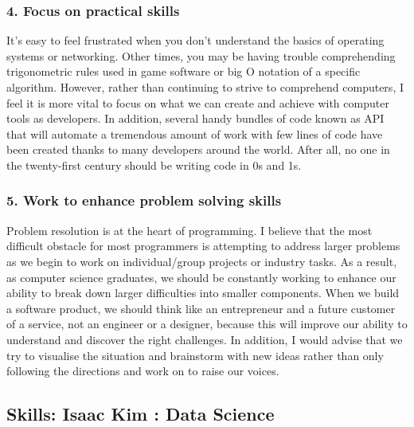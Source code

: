 \documentclass[a4paper, 11pt]{report}
\begin{document}
    \subsubsection{4. Focus on practical skills}
    It's easy to feel frustrated when you don't understand the basics of operating systems or networking. Other times, you may be having trouble comprehending trigonometric rules used in game software or big O notation of a specific algorithm. However, rather than continuing to strive to comprehend computers, I feel it is more vital to focus on what we can create and achieve with computer tools as developers. In addition, several handy bundles of code known as API that will automate a tremendous amount of work with few lines of code have been created thanks to many developers around the world. After all, no one in the twenty-first century should be writing code in 0s and 1s.
    \subsubsection{5. Work to enhance problem solving skills}
    Problem resolution is at the heart of programming. I believe that the most difficult obstacle for most programmers is attempting to address larger problems as we begin to work on individual/group projects or industry tasks. As a result, as computer science graduates, we should be constantly working to enhance our ability to break down larger difficulties into smaller components. When we build a software product, we should think like an entrepreneur and a future customer of a service, not an engineer or a designer, because this will improve our ability to understand and discover the right challenges. In addition, I would advise that we try to visualise the situation and brainstorm with new ideas rather than only following the directions and work on to raise our voices.


\subsection{Skills: Isaac Kim : Data Science}
\end{document}
